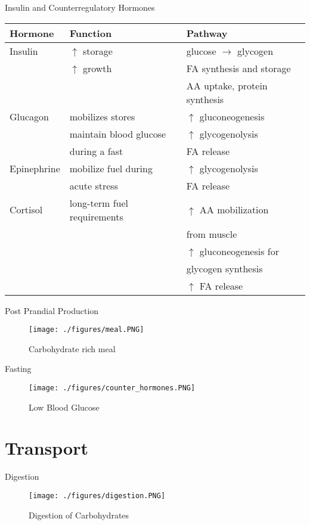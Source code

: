 \documentclass[presentation, smaller]{beamer}
\begin{document}
\begin{frame}[label={sec:org5f8d400}]{Insulin and Counterregulatory Hormones}
\begin{center}
\begin{tabular}{lll}
Hormone & Function & Pathway\\
\hline
Insulin & \(\uparrow\) storage & glucose \(\to\) glycogen\\
 & \(\uparrow\) growth & FA synthesis and storage\\
 &  & AA uptake, protein synthesis\\
\hline
Glucagon & mobilizes stores & \(\uparrow\) gluconeogenesis\\
 & maintain blood glucose & \(\uparrow\) glycogenolysis\\
 & during a fast & FA release\\
\hline
Epinephrine & mobilize fuel during & \(\uparrow\) glycogenolysis\\
 & acute stress & FA release\\
\hline
Cortisol & long-term fuel requirements & \(\uparrow\) AA mobilization\\
 &  & from muscle\\
 &  & \(\uparrow\) gluconeogenesis for\\
 &  & glycogen synthesis\\
 &  & \(\uparrow\) FA release\\
\end{tabular}
\end{center}
\end{frame}

\begin{frame}[label={sec:org8bc9844}]{Post Prandial Production}
\begin{figure}[htbp]
\centering
\texttt{[image: ./figures/meal.PNG]}
\caption{\label{fig:org28dbcc9}
Carbohydrate rich meal}
\end{figure}
\end{frame}

\begin{frame}[label={sec:org5d24e97}]{Fasting}
\begin{figure}[htbp]
\centering
\texttt{[image: ./figures/counter\_hormones.PNG]}
\caption{\label{fig:orga0ecc9d}
Low Blood Glucose}
\end{figure}
\end{frame}

\section{Transport}
\label{sec:orgc4df01f}
\begin{frame}[label={sec:org045401f}]{Digestion}
\begin{figure}[htbp]
\centering
\texttt{[image: ./figures/digestion.PNG]}
\caption{\label{fig:orgaaeed64}
Digestion of Carbohydrates}
\end{figure}
\end{frame}
\end{document}

